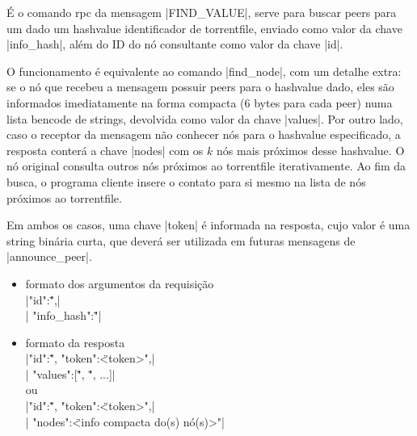 \label{subsubsubsec:getpeers}

É o comando \gls*{rpc} da mensagem \bverb|FIND_VALUE|, serve para buscar \glspl*{peer}
para um dado um \gls*{hashvalue} identificador de \gls*{torrentfile}, enviado como
valor da chave \bverb|info_hash|, além do ID do nó consultante como valor da chave
\bverb|id|.

O funcionamento é equivalente ao comando \bverb|find_node|, com um detalhe extra: se o
nó que recebeu a mensagem possuir \glspl*{peer} para o \gls*{hashvalue} dado, eles são
informados imediatamente na forma compacta (6 bytes para cada \gls*{peer}) numa lista
\gls*{bencode} de \glspl*{string}, devolvida como valor da chave \bverb|values|. Por
outro lado, caso o receptor da mensagem não conhecer nós para o \gls*{hashvalue}
especificado, a resposta conterá a chave \bverb|nodes| com os $k$ nós mais próximos
desse \gls*{hashvalue}. O nó original consulta outros nós próximos ao \gls*{torrentfile}
iterativamente. Ao fim da busca, o programa cliente insere o contato para si mesmo na
lista de nós próximos ao \gls*{torrentfile}.

Em ambos os casos, uma chave \bverb|token| é informada na resposta, cujo valor é uma
\gls*{string} binária curta, que deverá ser utilizada em futuras mensagens de
\bverb|announce_peer|.


\begin{itemize}
    \item formato dos argumentos da requisição \\
        \sverb|{"id":\"<IDs dos nós consultantes>",| \\
        \sverb| "info_hash":\"<hash de 20 bytes do torrent buscado>"}|

    \item formato da resposta \\
        \sverb|{"id":\"<IDs dos nós consultados>", "token":\"<token>",| \\
        \sverb| "values":[\"<info peer 1>", \"<info peer 2>", ...]}| \\
        ou \\
        \sverb|{"id":\"<IDs dos nós consultados>", "token":\"<token>",| \\
        \sverb| "nodes":\"<info compacta do(s) nó(s)>"}| \\ \\
\end{itemize}

